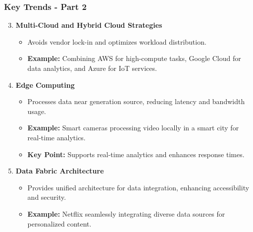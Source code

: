 \documentclass{beamer}
\begin{document}
\begin{frame}[fragile]
    \frametitle{Key Trends - Part 2}
    \begin{enumerate}
        \setcounter{enumi}{2} %
        \item \textbf{Multi-Cloud and Hybrid Cloud Strategies}
            \begin{itemize}
                \item Avoids vendor lock-in and optimizes workload distribution.
                \item \textbf{Example:} Combining AWS for high-compute tasks, Google Cloud for data analytics, and Azure for IoT services.
            \end{itemize}
        
        \item \textbf{Edge Computing}
            \begin{itemize}
                \item Processes data near generation source, reducing latency and bandwidth usage.
                \item \textbf{Example:} Smart cameras processing video locally in a smart city for real-time analytics.
                \item \textbf{Key Point:} Supports real-time analytics and enhances response times.
            \end{itemize}
        
        \item \textbf{Data Fabric Architecture}
            \begin{itemize}
                \item Provides unified architecture for data integration, enhancing accessibility and security.
                \item \textbf{Example:} Netflix seamlessly integrating diverse data sources for personalized content.
            \end{itemize}
    \end{enumerate}
\end{frame}
\end{document}
